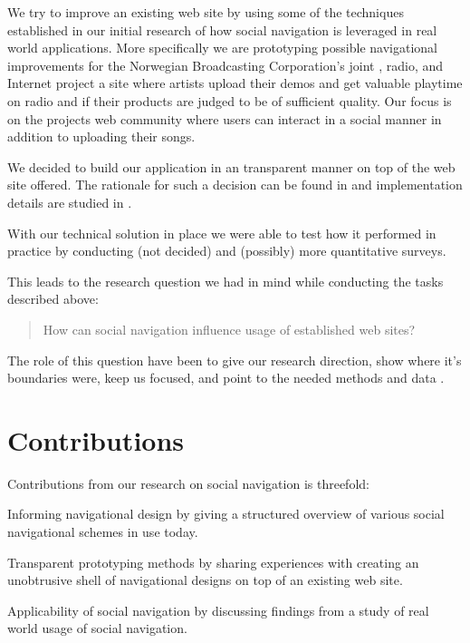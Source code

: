 We try to improve an existing web site by using some of the techniques
established in our initial research of how social navigation is leveraged
in real world applications. More specifically we are prototyping possible
navigational improvements for the Norwegian Broadcasting Corporation's joint
, radio, and Internet project \project{\urort}\dash{}a site where
artists upload their demos and get valuable playtime on radio and  if
their products are judged to be of sufficient quality. Our focus is on the
projects web community%
where users can interact in a social manner in addition to uploading
their songs.

We decided to build our application in an transparent manner on top of the
web site \urort offered. The rationale for such a decision can be found in
 and implementation details are studied
in .

With our technical solution in place we were able to test how it performed in
practice by conducting  (not decided) and
(possibly) more quantitative surveys.

This leads to the research question we had in mind while conducting
the tasks described above:

\begin{quote}
  How can social navigation influence usage of established web sites?
\end{quote}

The role of this question have been to give our research direction, show where
it's boundaries were, keep us focused, and point to the needed methods and
data \citep[p.~77]{silverman05}.


\section{Contributions}

Contributions from our research on social navigation is threefold:

\begin{enum}
  \item Informing navigational design by giving a structured overview of
    various social navigational schemes in use today.
  \item Transparent prototyping methods by sharing experiences with
    creating an unobtrusive shell of navigational designs on top of an
    existing web site.
  \item Applicability of social navigation by discussing findings from
    a study of real world usage of social navigation.
\end{enum}

